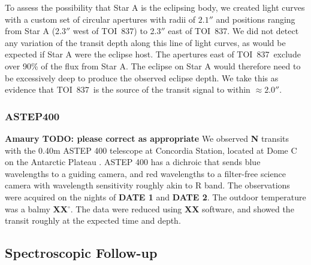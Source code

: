 \documentclass[12pt,twocolumn,tighten]{aastex63}
\newcommand{\tn}{TOI~837} %
\begin{document}
To assess the possibility that Star A is the eclipsing body,
we created light curves with a custom set of circular apertures
with radii of $2.1''$ and positions ranging from Star A (2.3$''$ west of \tn) to 2.3$''$
east of \tn.  We did not detect any variation of the transit depth
along this line of light curves, as would be expected if Star A were
the eclipse host.  The apertures east of \tn\ exclude over 90\% of the flux from Star A.
The eclipse on Star A would therefore need to be excessively deep to
produce the observed eclipse depth.
We take this as evidence that \tn\ is the source of the transit signal
to within $\approx2.0''$.



\subsubsection{ASTEP400}

{\bf Amaury TODO: please correct as appropriate}
We observed {\bf N} transits with the 0.40m ASTEP 400 telescope at
Concordia Station, located at Dome C on the Antarctic Plateau
\citep{daban_astep_2010}.  ASTEP 400 has a dichroic that sends blue
wavelengths to a guiding camera, and red wavelengths to a filter-free
science camera with wavelength sensitivity roughly akin to R band.
The observations were acquired on the nights of {\bf DATE 1} and {\bf
DATE 2}.  The outdoor temperature was a balmy {\bf XX$^\circ$}.  The
data were reduced using {\bf XX} software, and showed the transit
roughly at the expected time and depth.


\subsection{Spectroscopic Follow-up}
\label{subsec:spectra}
\end{document}
